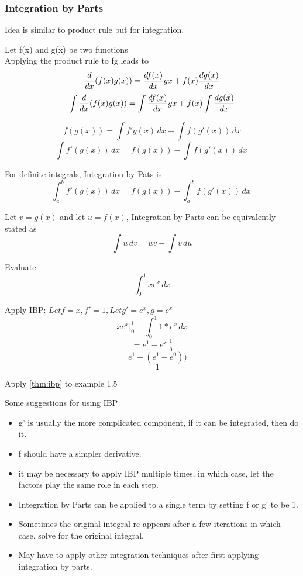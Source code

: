\documentclass[english, 12pt]{article}
\begin{document}
\subsubsection{Integration by Parts}
Idea is similar to product rule but for integration.
\begin{thrm}\label{thm:ibp}
Let f(x) and g(x) be two functions\\
Applying the product rule to fg leads to 
\[\frac{d}{dx}(f(x)g(x)) = \frac{d f(x)}{dx} gx + f(x) \frac{d g(x)}{dx} \]
\[\int \frac{d}{dx}(f(x)g(x)) = \int\frac{d f(x)}{dx} gx + f(x) \int \frac{d g(x)}{dx}  \]

\[f(g(x)) = \int f'g(x)\, dx + \int f(g'(x))\,dx\]
\[\int f'(g(x))\, dx = f(g(x)) -\int f(g'(x))\,dx\  \]
\end{thrm}

For definite integrals, Integration by Pats is 
\[\int_a^b f'(g(x))\, dx = f(g(x)) -\int_a^b f(g'(x))\,dx\  \]

\begin{note}
Let $v = g(x)$ and let $u = f(x)$, Integration by Parts can be equivalently stated as 
\[\int u\,dv = uv- \int v\,du\]
\end{note}
\begin{exmp}
Evaluate
\[ \int_0^1 x e^x \,dx\]
\begin{sol}
Apply IBP: $Let f = x, f' = 1, Let g' = e^x , g = e^x$
\[ xe^x \Big|_0^1 - \int_0^1 1*e^x\,dx\]
\[= e^1 - e^x \Big|_{0}^{1}\]
\[= e^1 - (e^1 - e^0))\]
\[=1\]
\end{sol}
\end{exmp}

\begin{exercise}
Apply \ref{thm:ibp} to example 1.5
\end{exercise}
Some suggestions for using IBP
\begin{itemize}
\item g' is usually the more complicated component, if it can be integrated, then do it.
\item  f should have a simpler derivative.
\item it may be necessary to apply IBP multiple times, in which case, let the factors play the same role in each step.
\item Integration by Parts can be applied to a single term by setting f or g' to be 1.
\item Sometimes the original integral re-appears after a few iterations in which case, solve for the original integral.
\item May have to apply other integration techniques after first applying integration by parts.
\end{itemize}
\end{document}
